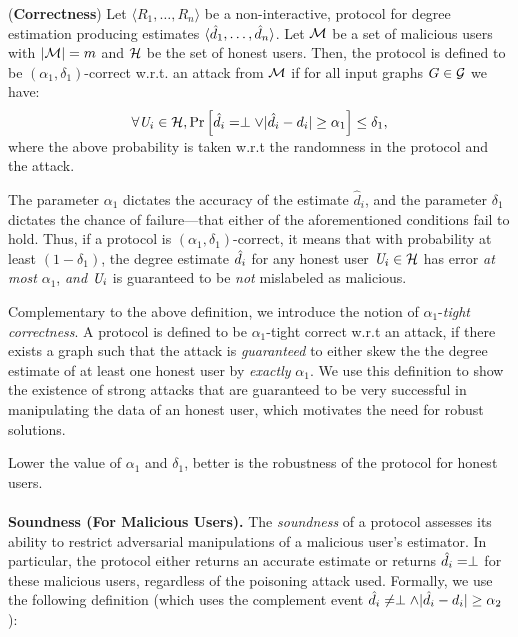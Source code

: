 \begin{defn}\label{chap4-def:correct}(\textbf{Correctness}) Let 
  $\langle R_1, \ldots, R_n\rangle$ be a non-interactive, \ldp{} protocol for degree estimation producing estimates $\langle \hat{d}_1, \ldots, \hat{d}_n\rangle$. Let $\mathcal{M}$ be a set of malicious users with $|\mathcal{M}| = m$ and $\mathcal{H}$ be the set of honest users. 
Then, the protocol is defined to be $(\alpha_1,\delta_1)$-correct w.r.t. an attack from $\mathcal{M}$ if for all input graphs $G\in \mathcal{G}$ we have:
  \begin{gather}  \vspace{-0.2cm}  
    \forall \DO_i \in \calH, \mathrm{Pr}\left[\hat{d}_i = \bottom \vee
    |\hat{d}_i-d_i|\geq \alpha_1\right]\leq \delta_1,\label{chap4-eq:correct1}
  \end{gather}
where the above probability is taken w.r.t  the randomness in the protocol and the attack.
\end{defn}
The parameter $\alpha_1$ dictates the accuracy of the estimate $\hat{d}_i$, and the parameter $\delta_1$ dictates the chance of failure---that either of the aforementioned conditions fail to hold. Thus, if a protocol is $(\alpha_1,\delta_1)$-correct, it means that with probability at least $(1-\delta_1)$, 
the degree estimate $\hat{d}_i$ for any honest user $\textit{U}_i \in \mathcal{H}$ has error \textit{at most} $\alpha_1$, \textit{and} $\textit{U}_i$ is guaranteed to be \textit{not} mislabeled as malicious.

Complementary to the above definition, we introduce the notion of $\alpha_1$-\textit{tight correctness}. A protocol is defined to be $\alpha_1$-tight correct w.r.t an attack, if there exists a graph such that the attack is \textit{guaranteed} to either skew the  the degree estimate of at least one honest user by \textit{exactly} $\alpha_1$.  We use this definition to show the existence of strong attacks that are guaranteed to be very successful in manipulating the data of an honest user, which motivates the need for robust solutions. 

Lower the value of
$\alpha_1$ and $\delta_1$, better is the robustness of the protocol for honest users.  \vspace{-0.2cm}  \\\\ 
\noindent\textbf{Soundness (For Malicious Users). } The \textit{soundness} of a protocol assesses its ability to restrict adversarial manipulations of a malicious user's estimator. In particular, the protocol either returns an accurate estimate or returns $\hat{d}_i = \perp$ for these malicious users, regardless of the poisoning attack used. Formally, we use the following definition (which uses the complement event $\hat{d}_i \neq \perp \wedge |\hat{d}_i - d_i| \geq \alpha_2$):

